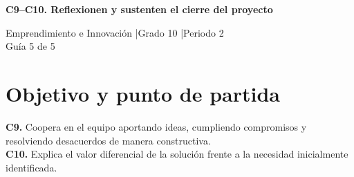 \makeatletter
{}
\makeatother


\usepackage[spanish]{babel}
\usepackage{lmodern}
\usepackage{titlesec}
\geometry{a4paper,margin=1.6cm}
\linespread{1.10}

\hypersetup{allcolors=LinkColor}
\newcommand{\guidelink}[2]{\href{#1}{\textbf{\underline{#2}}}}
\newcommand{\instruction}[1]{\textcolor{InstructionColor}{\textbf{#1}}}
\newcommand{\concept}[1]{\textcolor{ConceptColor}{\textbf{#1}}}
\newcommand{\checkbox}{%
    \begingroup
    \setlength{\fboxrule}{0.4pt}%
    \setlength{\fboxsep}{2pt}%
    \fbox{\rule{0pt}{0.8ex}\rule{0.8ex}{0pt}}%
    \endgroup}

\setlength{\parskip}{4pt}
\setlength{\tabcolsep}{5pt}
\renewcommand{\arraystretch}{1.15}
\titleformat{\section}{\large\bfseries\color{HeadingColor}}{}{0pt}{}
\titlespacing*{\section}{0pt}{10pt}{3pt}




\begin{center}
{\Large\bfseries\color{HeadingColor} C9--C10. Reflexionen y sustenten el cierre del proyecto\par}
\vspace{3pt}
Emprendimiento e Innovación \enspace|\enspace Grado 10 \enspace|\enspace Periodo 2\\
Guía 5 de 5
\end{center}

\section*{Objetivo y punto de partida}
\concept{C9.} Coopera en el equipo aportando ideas, cumpliendo compromisos y resolviendo desacuerdos de manera constructiva.\\
\concept{C10.} Explica el valor diferencial de la solución frente a la necesidad inicialmente identificada.

